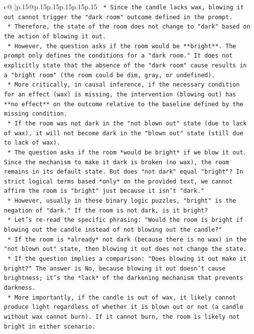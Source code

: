 \documentclass{article}
\begin{document}
{\begin{supertabular}{c@{$\;$}|p{.15\linewidth}@{}p{.15\linewidth}p{.15\linewidth}p{.15\linewidth}p{.15\linewidth}p{.15\linewidth}}
{{{\texttt{    *   Since the candle lacks wax, blowing it out cannot trigger the "dark room" outcome defined in the prompt.} \\
\texttt{    *   Therefore, the state of the room does not change to "dark" based on the action of blowing it out.} \\
\texttt{    *   However, the question asks if the room would be **bright**. The prompt only defines the conditions for a "dark room." It does not explicitly state that the absence of the "dark room" cause results in a "bright room" (the room could be dim, gray, or undefined).} \\
\texttt{    *   More critically, in causal inference, if the necessary condition for an effect (wax) is missing, the intervention (blowing out) has **no effect** on the outcome relative to the baseline defined by the missing condition.} \\
\texttt{    *   If the room was not dark in the "not blown out" state (due to lack of wax), it will not become dark in the "blown out" state (still due to lack of wax).} \\
\texttt{    *   The question asks if the room *would be bright* if we blow it out. Since the mechanism to make it dark is broken (no wax), the room remains in its default state. But does "not dark" equal "bright"? In strict logical terms based *only* on the provided text, we cannot affirm the room is "bright" just because it isn't "dark."} \\
\texttt{    *   However, usually in these binary logic puzzles, "bright" is the negation of "dark." If the room is not dark, is it bright?} \\
\texttt{    *   Let's re{-}read the specific phrasing: "Would the room is bright if blowing out the candle instead of not blowing out the candle?"} \\
\texttt{    *   If the room is *already* not dark (because there is no wax) in the "not blown out" state, then blowing it out does not change the state.} \\
\texttt{    *   If the question implies a comparison: "Does blowing it out make it bright?" The answer is No, because blowing it out doesn't cause brightness; it's the *lack* of the darkening mechanism that prevents darkness.} \\
\texttt{    *   More importantly, if the candle is out of wax, it likely cannot produce light regardless of whether it is blown out or not (a candle without wax cannot burn). If it cannot burn, the room is likely not bright in either scenario.} \\
}}}
\end{supertabular}}
\end{document}
